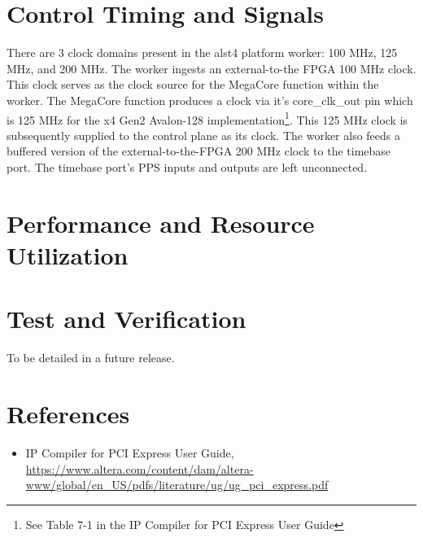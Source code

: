 \documentclass{article}
\edef\ecomp{alst4}
\begin{document}
\section*{Control Timing and Signals}
	There are 3 clock domains present in the alst4 platform worker: 100 MHz, 125 MHz, and 200 MHz. The worker ingests an external-to-the FPGA 100 MHz clock. This clock serves as the clock source for the MegaCore function within the worker. The MegaCore function produces a clock via it's core\_clk\_out pin which is 125 MHz for the x4 Gen2 Avalon-128 implementation\footnote{See Table 7-1 in the IP Compiler for PCI Express User Guide}. This 125 MHz clock is subsequently supplied to the control plane as its clock. The worker also feeds a buffered version of the external-to-the-FPGA 200 MHz clock to the timebase port. The timebase port's PPS inputs and outputs are left unconnected.
\begin{landscape}
\section*{Performance and Resource Utilization}
%


\section*{Test and Verification}
\begin{flushleft}
 To be detailed in a future release.
\end{flushleft}
\section*{References}
\begin{flushleft}
	\begin{itemize}
		\item[1)] IP Compiler for PCI Express User Guide, \url{https://www.altera.com/content/dam/altera-www/global/en_US/pdfs/literature/ug/ug_pci_express.pdf} \\

	\end{itemize}
\end{flushleft}
\end{landscape}
\end{document}
